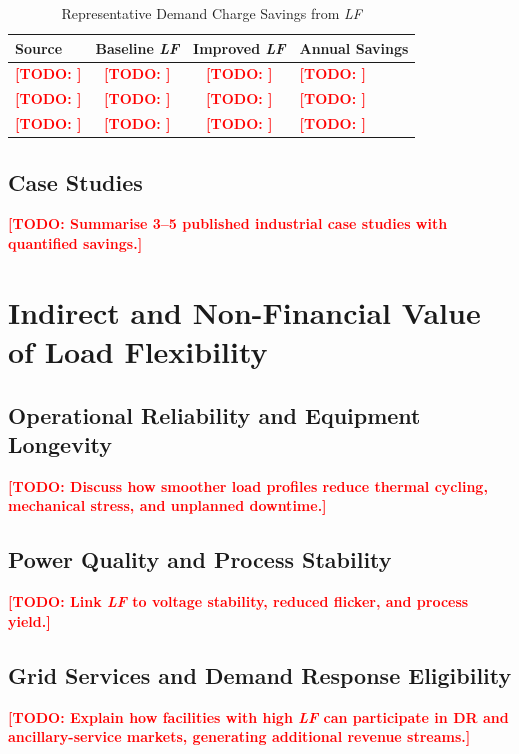 \documentclass[12pt, a4paper, twocolumn]{article}
\newcommand{\LF}{\textit{LF}}
\newcommand{\TODO}[1]{\textcolor{red}{\textbf{[TODO: #1]}}}
\begin{document}
\begin{table}[H]
\centering
\caption{Representative Demand Charge Savings from \LF{}}
\label{tab:savings}
\begin{tabularx}{\columnwidth}{lccX}
\toprule
\textbf{Source} & \textbf{Baseline \LF{}} & \textbf{Improved \LF{}} & \textbf{Annual Savings} \\
\midrule
\TODO{} & \TODO{} & \TODO{} & \TODO{} \\
\TODO{} & \TODO{} & \TODO{} & \TODO{} \\
\TODO{} & \TODO{} & \TODO{} & \TODO{} \\
\bottomrule
\end{tabularx}
\end{table}

\subsection{Case Studies}
\TODO{Summarise 3--5 published industrial case studies with quantified savings.}


\section{Indirect and Non-Financial Value of Load Flexibility}
\label{sec:indirect-value}

\subsection{Operational Reliability and Equipment Longevity}
\TODO{Discuss how smoother load profiles reduce thermal cycling, mechanical stress, and unplanned downtime.}

\subsection{Power Quality and Process Stability}
\TODO{Link \LF{} to voltage stability, reduced flicker, and process yield.}

\subsection{Grid Services and Demand Response Eligibility}
\TODO{Explain how facilities with high \LF{} can participate in DR and ancillary-service markets, generating additional revenue streams.}
\end{document}
